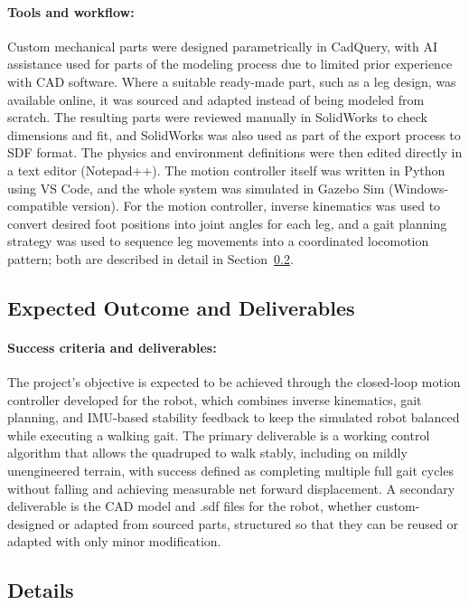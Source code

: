\documentclass[12pt]{article}
\begin{document}
\paragraph{Tools and workflow:} Custom mechanical parts were designed parametrically in CadQuery, with AI assistance used for parts of the modeling process due to limited prior experience with CAD software. Where a suitable ready-made part, such as a leg design, was available online, it was sourced and adapted instead of being modeled from scratch. The resulting parts were reviewed manually in SolidWorks to check dimensions and fit, and SolidWorks was also used as part of the export process to SDF format. The physics and environment definitions were then edited directly in a text editor (Notepad++). The motion controller itself was written in Python using VS Code, and the whole system was simulated in Gazebo Sim (Windows-compatible version). For the motion controller, inverse kinematics was used to convert desired foot positions into joint angles for each leg, and a gait planning strategy was used to sequence leg movements into a coordinated locomotion pattern; both are described in detail in Section~\ref{subsec:details}.

\subsection{Expected Outcome and Deliverables}
\label{subsec:expected-outcome}
\paragraph{Success criteria and deliverables:} The project's objective is expected to be achieved through the closed-loop motion controller developed for the robot, which combines inverse kinematics, gait planning, and IMU-based stability feedback to keep the simulated robot balanced while executing a walking gait. The primary deliverable is a working control algorithm that allows the quadruped to walk stably, including on mildly unengineered terrain, with success defined as completing multiple full gait cycles without falling and achieving measurable net forward displacement. A secondary deliverable is the CAD model and .sdf files for the robot, whether custom-designed or adapted from sourced parts, structured so that they can be reused or adapted with only minor modification.

\subsection{Details}
\label{subsec:details}
\end{document}
